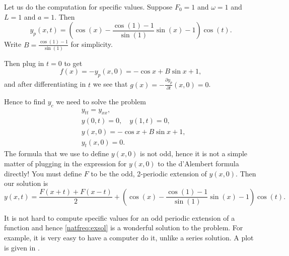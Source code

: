 \documentclass{ximera}
\begin{document}
\begin{example}
    Let us do the computation for specific values. Suppose $F_0 = 1$ and $\omega = 1$ and $L=1$ and $a=1$.  Then 
    \begin{equation*}
        y_p(x,t) = \left( \cos (x) - \frac{\cos (1) - 1}{\sin (1)} \sin (x) -1 \right) \cos (t) .
    \end{equation*}
    Write $B = \frac{\cos (1) - 1}{\sin (1)}$ for simplicity.
    
    Then plug in $t=0$ to get
    \begin{equation*}
        f(x) =- y_p(x,0) = - \cos x + B \sin x +1 ,
    \end{equation*}
    and after differentiating in $t$ we see that  $g(x) = -\frac{\partial y_p}{\partial t}(x,0) = 0$.
    
    Hence to find $y_c$ we need to solve the problem
    \begin{align*}
        & y_{tt} = y_{xx} , \\
        & y(0,t) = 0 , \quad y(1,t) = 0 , \\
        & y(x,0) = - \cos x + B \sin x +1 , \\
        & y_t(x,0) = 0 .
    \end{align*}
    The formula that we use to define $y(x,0)$ is not odd, hence it is not a simple matter of plugging in the expression for $y(x,0)$ to the d'Alembert formula directly!  You must define $F$ to be the odd, 2-periodic extension of $y(x,0)$.  Then our solution is
    \begin{equation} \label{natfreq:exsol}
        y(x,t) = \frac{F(x+t) + F(x-t)}{2} + \left(\cos (x) - \frac{\cos (1) - 1}{\sin (1)} \sin (x) -1 \right) \cos (t) .
    \end{equation}
    
    It is not hard to compute specific values for an odd periodic extension of a function and hence \eqref{natfreq:exsol} is a wonderful solution to the problem. For example, it is very easy to have a computer do it, unlike a series solution. A plot is given in .
    \begin{myfig}
        \capstart
        \caption{Plot of $y(x,t) = \frac{F(x+t) + F(x-t)}{2} + \left( \cos (x) -\frac{\cos (1) - 1}{\sin (1)} \sin (x) -1 \right) \cos (t)$.%
        \label{natfreq:forcedvibfig}}
    \end{myfig}
\end{example}
\end{document}
